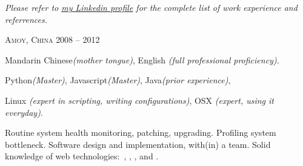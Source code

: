 \documentclass[10pt,a4paper]{article} %
\begin{document}
\begin{center}
  \textit{Please refer to \href{http://www.linkedin.com/in/linju}{my Linkedin profile} for the complete list of work experience and referrences.}
\end{center}


\spacedhrule{-0.2em}{-0.4em} %



 {
  \textsc{Amoy, China}
} {
   {
    2008 -- 2012
  } {
  }
}

\spacedhrule{0.5em}{-0.4em} %



 {
  Mandarin Chinese\textit{(mother tongue)},
  English \textit{(full professional proficiency)}.
}

 {
  Python\textit{(Master)},
  Javascript\textit{(Master)},
  Java\textit{(prior experience)},
}

 {
  Linux \textit{(expert in scripting, writing configurations)},
  OSX \textit{(expert, using it everyday)}.
}

 {
  Routine system health monitoring, patching, upgrading.
  Profiling system bottleneck.
  Software design and implementation, with(in) a team.
  Solid knowledge of web technologies:\ , , ,  and .
}
\end{document}
